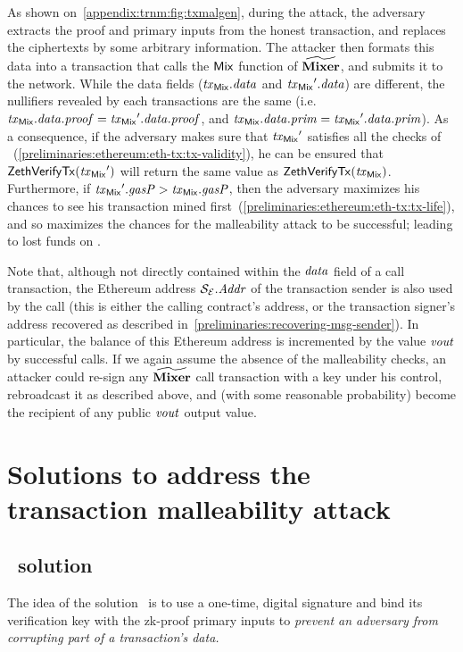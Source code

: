 As shown on~\cref{appendix:trnm:fig:txmalgen}, during the attack, the adversary extracts the proof and primary inputs from the honest transaction, and replaces the ciphertexts by some arbitrary information.
The attacker then formats this data into a transaction that calls the $\mathsf{Mix}$ function of $\widetilde{\mathbf{Mixer}}$, and submits it to the network.
While the data fields ($\mathit{\mathit{tx}_{\mathsf{Mix}}}.\mathit{data}$ and $\mathit{\mathit{tx}_{\mathsf{Mix}}}'.\mathit{data}$) are different, the nullifiers revealed by each transactions are the same (i.e.~$\mathit{\mathit{tx}_{\mathsf{Mix}}}.\mathit{data}.\mathit{proof} = \mathit{\mathit{tx}_{\mathsf{Mix}}}'.\mathit{data}.\mathit{proof}$, and $\mathit{\mathit{tx}_{\mathsf{Mix}}}.\mathit{data}.\mathit{prim} = \mathit{\mathit{tx}_{\mathsf{Mix}}}'.\mathit{data}.\mathit{prim}$).
As a consequence, if the adversary makes sure that $\mathit{\mathit{tx}_{\mathsf{Mix}}}'$ satisfies all the checks of \ethVerifyTx{}~(\cref{preliminaries:ethereum:eth-tx:tx-validity}), he can be ensured that $\mathsf{ZethVerifyTx}(\mathit{\mathit{tx}_{\mathsf{Mix}}}')$ will return the same value as $\mathsf{ZethVerifyTx}(\mathit{\mathit{tx}_{\mathsf{Mix}}})$.
Furthermore, if $\mathit{\mathit{tx}_{\mathsf{Mix}}}'.\mathit{gasP} > \mathit{\mathit{tx}_{\mathsf{Mix}}}.\mathit{gasP}$, then the adversary maximizes his chances to see his transaction mined first~(\cref{preliminaries:ethereum:eth-tx:tx-life}), and so maximizes the chances for the malleability attack to be successful; leading to lost funds on \mixer.

\begin{remark}\label{appendix:trnm:resign-tx-attack}
  Note that, although not directly contained within the $\mathit{data}$ field of a \mixer{} call transaction, the Ethereum address $\mathcal{{S}_{E}}.\mathit{Addr}$ of the transaction sender is also used by the \mixer{} call (this is either the calling contract's address, or the transaction signer's address recovered as described in~\cref{preliminaries:recovering-msg-sender}). In particular, the balance of this Ethereum address is incremented by the value $\mathit{vout}$ by successful \mix{} calls.
  If we again assume the absence of the malleability checks, an attacker could re-sign any $\widetilde{\mathbf{Mixer}}$ call transaction with a key under his control, rebroadcast it as described above, and (with some reasonable probability) become the recipient of any public $\mathit{vout}$ output value.
\end{remark}

\section{Solutions to address the transaction malleability attack}

\subsection{\zerocash~solution}\label{appendix:trnm:ssec:zerocash-trnm}
The idea of the solution~\cite{sasson2014zerocash} is to use a one-time, \sufcma{} digital signature and bind its verification key with the zk-proof primary inputs to \emph{prevent an adversary from corrupting part of a transaction's data.}

